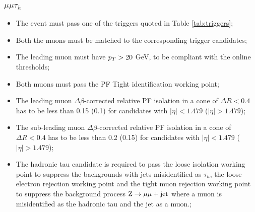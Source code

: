 \subsubsection{$\mu\mu\tau_h$}
\begin{itemize}
\item The event must pass one of the triggers quoted in Table \ref{tab:triggers};
\item Both the muons must be matched to the corresponding trigger candidates;
\item The leading muon must have $p_{T} > 20$ GeV, to be compliant with the online thresholds;
\item Both muons must pass the PF Tight identification working point;
\item The leading muon $\Delta \beta$-corrected relative PF isolation in a cone of $\Delta R < 0.4$ has to be less than 0.15 (0.1) for candidates with $|\eta| < 1.479$ ($|\eta| > 1.479$);
\item The sub-leading muon $\Delta \beta$-corrected relative PF isolation in a cone of $\Delta R < 0.4$ has to be less than 0.2 (0.15) for candidates with $|\eta| < 1.479$ ($|\eta| > 1.479$);
\item The hadronic tau candidate is required to pass the loose isolation working point to suppress the backgrounds with jets misidentified as $\tau_h$, the loose electron rejection working point and the tight muon rejection working point to suppress the background process $\mathrm{Z}\rightarrow\mu\mu+\mathrm{jet}$ where a muon is misidentified as the hadronic tau and the jet as a muon.;
\end{itemize}

